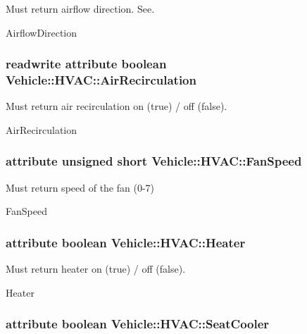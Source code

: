 Must return airflow direction. See. 

Airflow\-Direction \hypertarget{interfaceVehicle_1_1HVAC_a3d685910812578b01c0187f0e1ed03c0}{
\subsubsection[{Air\-Recirculation}]{\setlength{\rightskip}{0pt plus 5cm}readwrite attribute boolean Vehicle\-::\-H\-V\-A\-C\-::\-Air\-Recirculation}}\label{interfaceVehicle_1_1HVAC_a3d685910812578b01c0187f0e1ed03c0}


Must return air recirculation on (true) / off (false). 

Air\-Recirculation \hypertarget{interfaceVehicle_1_1HVAC_a3394da3cefd51a29e34de5530cd70e70}{
\subsubsection[{Fan\-Speed}]{\setlength{\rightskip}{0pt plus 5cm}attribute unsigned short Vehicle\-::\-H\-V\-A\-C\-::\-Fan\-Speed}}\label{interfaceVehicle_1_1HVAC_a3394da3cefd51a29e34de5530cd70e70}


Must return speed of the fan (0-\/7) 

Fan\-Speed \hypertarget{interfaceVehicle_1_1HVAC_a18300202ba83eb675c6a4c4c40267af1}{
\subsubsection[{Heater}]{\setlength{\rightskip}{0pt plus 5cm}attribute boolean Vehicle\-::\-H\-V\-A\-C\-::\-Heater}}\label{interfaceVehicle_1_1HVAC_a18300202ba83eb675c6a4c4c40267af1}


Must return heater on (true) / off (false). 

Heater \hypertarget{interfaceVehicle_1_1HVAC_a8ff708ae94435d515ba61e22a35fd4ec}{
\subsubsection[{Seat\-Cooler}]{\setlength{\rightskip}{0pt plus 5cm}attribute boolean Vehicle\-::\-H\-V\-A\-C\-::\-Seat\-Cooler}}\label{interfaceVehicle_1_1HVAC_a8ff708ae94435d515ba61e22a35fd4ec}


